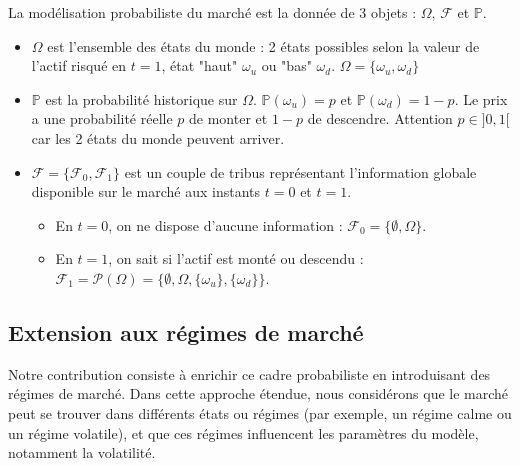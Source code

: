 \documentclass[12pt,a4paper]{report}
\begin{document}
\begin{center}
\end{center}

La modélisation probabiliste du marché est la donnée de 3 objets : $\Omega$, $\mathcal{F}$ et $\mathbb{P}$.

\begin{itemize}
    \item $\Omega$ est l'ensemble des états du monde : 2 états possibles selon la valeur de l'actif risqué en $t = 1$, état "haut" $\omega_u$ ou "bas" $\omega_d$. $\Omega = \{\omega_u, \omega_d\}$
    
    \item $\mathbb{P}$ est la probabilité historique sur $\Omega$. $\mathbb{P}(\omega_u) = p$ et $\mathbb{P}(\omega_d) = 1 - p$. Le prix a une probabilité réelle $p$ de monter et $1 - p$ de descendre. Attention $p \in ]0, 1[$ car les 2 états du monde peuvent arriver.
    
    \item $\mathcal{F} = \{\mathcal{F}_0, \mathcal{F}_1\}$ est un couple de tribus représentant l'information globale disponible sur le marché aux instants $t = 0$ et $t = 1$.
    \begin{itemize}
        \item En $t = 0$, on ne dispose d'aucune information : $\mathcal{F}_0 = \{\emptyset, \Omega\}$.
        \item En $t = 1$, on sait si l'actif est monté ou descendu : $\mathcal{F}_1 = \mathcal{P}(\Omega) = \{\emptyset, \Omega, \{\omega_u\}, \{\omega_d\}\}$.
    \end{itemize}
\end{itemize}

\subsection{Extension aux régimes de marché}

Notre contribution consiste à enrichir ce cadre probabiliste en introduisant des régimes de marché. Dans cette approche étendue, nous considérons que le marché peut se trouver dans différents états ou régimes (par exemple, un régime calme ou un régime volatile), et que ces régimes influencent les paramètres du modèle, notamment la volatilité.
\end{document}
